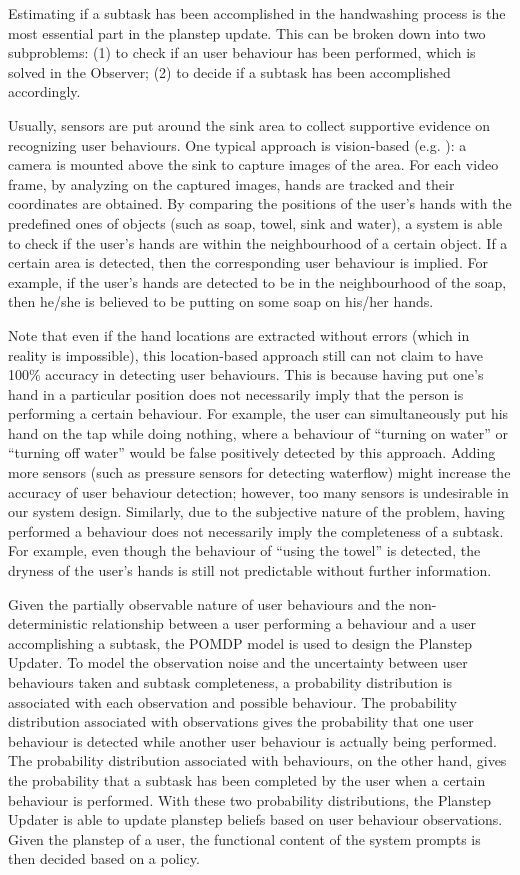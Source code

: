 Estimating if a subtask has been accomplished in the handwashing process is the most essential part in the planstep update. This can be broken down into two subproblems: (1) to check if an user behaviour has been performed, which is solved in the Observer; (2) to decide if a subtask has been accomplished accordingly.

Usually, sensors are put around the sink area to collect supportive evidence on recognizing user behaviours. One typical approach is vision-based (e.g. \cite{hoey2006tracking, mihailidis2004use, czarnuch2014}): a camera is mounted above the sink to capture images of the area. For each video frame, by analyzing on the captured images, hands are tracked and their coordinates are obtained. By comparing the positions of the user's hands with the predefined ones of objects (such as soap, towel, sink and water), a system is able to check if the user's hands are within the neighbourhood of a certain object. If a certain area is detected, then the corresponding user behaviour is implied. For example, if the user's hands are detected to be in the neighbourhood of the soap, then he/she is believed to be putting on some soap on his/her hands. 

Note that even if the hand locations are extracted without errors (which in reality is impossible), this location-based approach still can not claim to have 100\% accuracy in detecting user behaviours. This is because having put one's hand in a particular position does not necessarily imply that the person is performing a certain behaviour. For example, the user can simultaneously put his hand on the tap while doing nothing, where a behaviour of ``turning on water'' or ``turning off water'' would be false positively detected by this approach. Adding more sensors (such as pressure sensors for detecting waterflow) might increase the accuracy of user behaviour detection; however, too many sensors is undesirable in our system design. Similarly, due to the subjective nature of the problem, having performed a behaviour does not necessarily imply the completeness of a subtask. For example, even though the behaviour of ``using the towel'' is detected, the dryness of the user's hands is still not predictable without further information. 

Given the partially observable nature of user behaviours and the non-deterministic relationship between a user performing a behaviour and a user accomplishing a subtask, the POMDP model is used to design the Planstep Updater. To model the observation noise and the uncertainty between user behaviours taken and subtask completeness, a probability distribution is associated with each observation and possible behaviour. The probability distribution associated with observations gives the probability that one user behaviour is detected while another user behaviour is actually being performed. The probability distribution associated with behaviours, on the other hand, gives the probability that a subtask has been completed by the user when a certain behaviour is performed. With these two probability distributions, the Planstep Updater is able to update planstep beliefs based on user behaviour observations. Given the planstep of a user, the functional content of the system prompts is then decided based on a policy.


